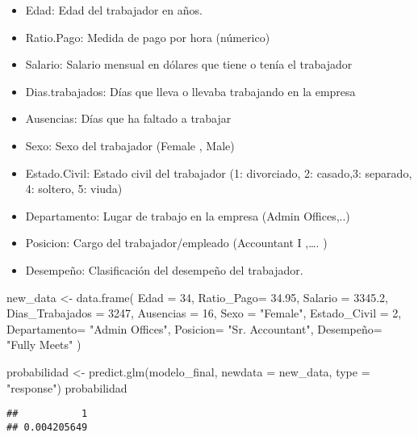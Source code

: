 \documentclass[
]{article}
\newenvironment{Shaded}{\begin{snugshade}}{\end{snugshade}}
\newcommand{\AttributeTok}[1]{\textcolor[rgb]{0.77,0.63,0.00}{#1}}
\newcommand{\DecValTok}[1]{\textcolor[rgb]{0.00,0.00,0.81}{#1}}
\newcommand{\FloatTok}[1]{\textcolor[rgb]{0.00,0.00,0.81}{#1}}
\newcommand{\FunctionTok}[1]{\textcolor[rgb]{0.00,0.00,0.00}{#1}}
\newcommand{\NormalTok}[1]{#1}
\newcommand{\OtherTok}[1]{\textcolor[rgb]{0.56,0.35,0.01}{#1}}
\newcommand{\StringTok}[1]{\textcolor[rgb]{0.31,0.60,0.02}{#1}}
\providecommand{\tightlist}{%
  \setlength{\itemsep}{0pt}\setlength{\parskip}{0pt}}
\begin{document}
\begin{itemize}
\tightlist
\item
  Edad: Edad del trabajador en años.
\item
  Ratio.Pago: Medida de pago por hora (númerico)
\item
  Salario: Salario mensual en dólares que tiene o tenía el trabajador
\item
  Dias.trabajados: Días que lleva o llevaba trabajando en la empresa
\item
  Ausencias: Días que ha faltado a trabajar
\item
  Sexo: Sexo del trabajador (Female , Male)
\item
  Estado.Civil: Estado civil del trabajador (1: divorciado, 2: casado,3:
  separado, 4: soltero, 5: viuda)
\item
  Departamento: Lugar de trabajo en la empresa (Admin Offices,..)
\item
  Posicion: Cargo del trabajador/empleado (Accountant I ,\ldots. )
\item
  Desempeño: Clasificación del desempeño del trabajador.
\end{itemize}

\begin{Shaded}
\begin{Highlighting}[]
\NormalTok{new\_data }\OtherTok{\textless{}{-}} \FunctionTok{data.frame}\NormalTok{(}
  \AttributeTok{Edad =} \DecValTok{34}\NormalTok{,}
  \AttributeTok{Ratio\_Pago=} \FloatTok{34.95}\NormalTok{,}
  \AttributeTok{Salario =} \FloatTok{3345.2}\NormalTok{,}
  \AttributeTok{Dias\_Trabajados =} \DecValTok{3247}\NormalTok{,}
  \AttributeTok{Ausencias =} \DecValTok{16}\NormalTok{,}
  \AttributeTok{Sexo =} \StringTok{"Female"}\NormalTok{,}
  \AttributeTok{Estado\_Civil =} \DecValTok{2}\NormalTok{,}
  \AttributeTok{Departamento=} \StringTok{"Admin Offices"}\NormalTok{,}
  \AttributeTok{Posicion=} \StringTok{"Sr. Accountant"}\NormalTok{,}
\NormalTok{  Desempeño}\OtherTok{=} \StringTok{"Fully Meets"}
\NormalTok{)}

\NormalTok{probabilidad }\OtherTok{\textless{}{-}} \FunctionTok{predict.glm}\NormalTok{(modelo\_final, }\AttributeTok{newdata =}\NormalTok{ new\_data, }\AttributeTok{type =} \StringTok{"response"}\NormalTok{)}
\NormalTok{probabilidad}
\end{Highlighting}
\end{Shaded}

\begin{verbatim}
##           1 
## 0.004205649
\end{verbatim}
\end{document}
